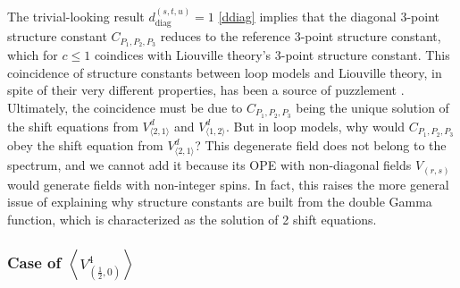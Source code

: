 \documentclass[12pt, a4paper]{article}
\theoremstyle{break}
\begin{document}
The trivial-looking result $d_\text{diag}^{(s,t,u)} = 1$ \eqref{ddiag} implies that the diagonal 3-point structure constant $C_{P_1,P_2,P_3}$ reduces to the reference 3-point structure constant, which for $c\leq 1$ coindices with Liouville theory's 3-point structure constant. This coincidence of structure constants between loop models and Liouville theory, in spite of their very different properties, has been a source of puzzlement \cite{ijs15, rib22}. Ultimately, the coincidence must be due to $C_{P_1,P_2,P_3}$ being the unique solution of 
the shift equations from $V^d_{\langle 2,1\rangle}$ and $V^d_{\langle 1,2\rangle}$. But in loop models, why would $C_{P_1,P_2,P_3}$ obey the shift equation from $V^d_{\langle 2,1\rangle}$? This degenerate field does not belong to the spectrum, and we cannot add it because its OPE with non-diagonal fields $V_{(r,s)}$ would generate fields with non-integer spins. In fact, this raises the more general issue of explaining why structure constants are built from the double Gamma function, which is characterized as the solution of 2 shift equations.

\subsubsection[Case of $\left<V_{(\frac12, 0)}^4\right>$]{Case of $\left<V_{(\frac12, 0)}^4\right>$ \pice}
\end{document}
